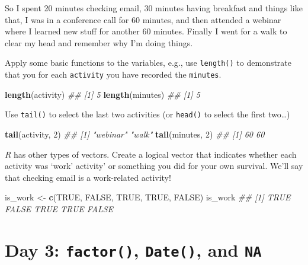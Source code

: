 \documentclass[
]{book}
\newenvironment{Shaded}{\begin{snugshade}}{\end{snugshade}}
\newcommand{\CommentTok}[1]{\textcolor[rgb]{0.56,0.35,0.01}{\textit{#1}}}
\newcommand{\DecValTok}[1]{\textcolor[rgb]{0.00,0.00,0.81}{#1}}
\newcommand{\KeywordTok}[1]{\textcolor[rgb]{0.13,0.29,0.53}{\textbf{#1}}}
\newcommand{\NormalTok}[1]{#1}
\newcommand{\OtherTok}[1]{\textcolor[rgb]{0.56,0.35,0.01}{#1}}
\newcommand{\StringTok}[1]{\textcolor[rgb]{0.31,0.60,0.02}{#1}}
\begin{document}
So I spent 20 minutes checking email, 30 minutes having breakfast and things like that, I was in a conference call for 60 minutes, and then attended a webinar where I learned new stuff for another 60 minutes. Finally I went for a walk to clear my head and remember why I'm doing things.

Apply some basic functions to the variables, e.g., use \texttt{length()} to demonstrate that you for each \texttt{activity} you have recorded the \texttt{minutes}.

\begin{Shaded}
\begin{Highlighting}[]
\KeywordTok{length}\NormalTok{(activity)}
\CommentTok{## [1] 5}
\KeywordTok{length}\NormalTok{(minutes)}
\CommentTok{## [1] 5}
\end{Highlighting}
\end{Shaded}

Use \texttt{tail()} to select the last two activities (or \texttt{head()} to select the first two\ldots)

\begin{Shaded}
\begin{Highlighting}[]
\KeywordTok{tail}\NormalTok{(activity, }\DecValTok{2}\NormalTok{)}
\CommentTok{## [1] "webinar" "walk"}
\KeywordTok{tail}\NormalTok{(minutes, }\DecValTok{2}\NormalTok{)}
\CommentTok{## [1] 60 60}
\end{Highlighting}
\end{Shaded}

\emph{R} has other types of vectors. Create a logical vector that indicates whether each activity was `work' activity' or something you did for your own survival. We'll say that checking email is a work-related activity!

\begin{Shaded}
\begin{Highlighting}[]
\NormalTok{is_work <-}\StringTok{ }\KeywordTok{c}\NormalTok{(}\OtherTok{TRUE}\NormalTok{, }\OtherTok{FALSE}\NormalTok{, }\OtherTok{TRUE}\NormalTok{, }\OtherTok{TRUE}\NormalTok{, }\OtherTok{FALSE}\NormalTok{)}
\NormalTok{is_work}
\CommentTok{## [1]  TRUE FALSE  TRUE  TRUE FALSE}
\end{Highlighting}
\end{Shaded}

\hypertarget{day-3-factor-date-and-na}{%
\section{\texorpdfstring{Day 3: \texttt{factor()}, \texttt{Date()}, and \texttt{NA}}{Day 3: factor(), Date(), and NA}}\label{day-3-factor-date-and-na}}
\end{document}
